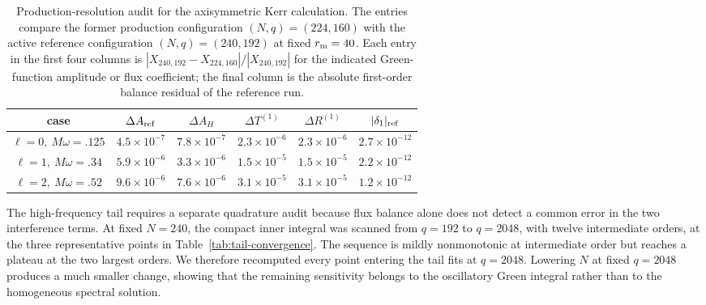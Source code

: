 \documentclass[aps,prd,twocolumn,10pt,nofootinbib,superscriptaddress,floatfix]{revtex4-2}
\begin{document}
\begin{table}[t]
\caption{Production-resolution audit for the axisymmetric Kerr calculation.
The entries compare the former production configuration $(N,q)=(224,160)$
with the active reference configuration $(N,q)=(240,192)$ at fixed
$r_{\rm m}=40$.  Each entry in the first four columns is
$|X_{240,192}-X_{224,160}|/|X_{240,192}|$ for the indicated Green-function
amplitude or flux coefficient; the final column is the
absolute first-order balance residual of the reference run.}
\label{tab:production-convergence}
\begin{ruledtabular}
\begin{tabular}{c c c c c c}
case & $\Delta A_{\rm ref}$ & $\Delta A_H$
& $\Delta T^{(1)}$ & $\Delta R^{(1)}$ & $|\delta_1|_{\rm ref}$\\
\hline
$\ell=0,\ M\omega=.125$ & $4.5\times10^{-7}$ & $7.8\times10^{-7}$
& $2.3\times10^{-6}$ & $2.3\times10^{-6}$ & $2.7\times10^{-12}$\\
$\ell=1,\ M\omega=.34$ & $5.9\times10^{-6}$ & $3.3\times10^{-6}$
& $1.5\times10^{-5}$ & $1.5\times10^{-5}$ & $2.2\times10^{-12}$\\
$\ell=2,\ M\omega=.52$ & $9.6\times10^{-6}$ & $7.6\times10^{-6}$
& $3.1\times10^{-5}$ & $3.1\times10^{-5}$ & $1.2\times10^{-12}$\\
\end{tabular}
\end{ruledtabular}
\end{table}

The high-frequency tail requires a separate quadrature audit because flux
balance alone does not detect a common error in the two interference terms.
At fixed $N=240$, the compact inner integral was scanned from $q=192$ to
$q=2048$, with twelve intermediate orders, at the three representative points
in Table~\ref{tab:tail-convergence}.  The sequence
is mildly nonmonotonic at intermediate order but reaches a plateau at the two
largest orders.  We therefore recomputed every point entering the tail fits at
$q=2048$.  Lowering $N$ at fixed $q=2048$ produces a much smaller change,
showing that the remaining sensitivity belongs to the oscillatory Green
integral rather than to the homogeneous spectral solution.
\end{document}
